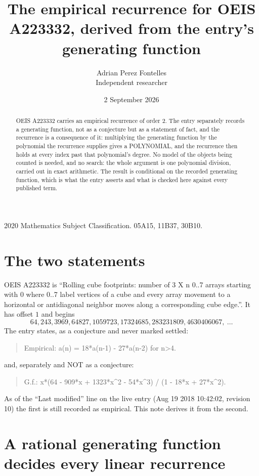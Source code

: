 \documentclass[11pt,a4paper]{article}
\title{The empirical recurrence for OEIS A223332, derived from the entry's generating function}
\author{Adrian Perez Fontelles\\ \small Independent researcher}
\date{2 September 2026}
\theoremstyle{plain}
\theoremstyle{definition}
\begin{document}
\maketitle

\begin{abstract}
OEIS A223332 carries an empirical recurrence of order $2$. The entry separately records a
generating function, not as a conjecture but as a statement of fact, and the recurrence is a
consequence of it: multiplying the generating function by the polynomial the recurrence
supplies gives a POLYNOMIAL, and the recurrence then holds at every index past that
polynomial's degree. No model of the objects being counted is needed, and no search: the
whole argument is one polynomial division, carried out in exact arithmetic. The result is
conditional on the recorded generating function, which is what the entry asserts and what is
checked here against every published term.
\end{abstract}

\noindent\small 2020 Mathematics Subject Classification. 05A15, 11B37, 30B10.\normalsize

\section{The two statements}

OEIS A223332 is ``Rolling cube footprints: number of 3 X n 0..7 arrays starting with 0 where 0..7 label vertices of a cube and every array movement to a horizontal or antidiagonal neighbor moves along a corresponding cube edge.''. It has offset $1$ and begins
\[
64, 243, 3969, 64827, 1059723, 17324685, 283231809, 4630406067,\ \dots
\]
The entry states, as a conjecture and never marked settled:
\begin{quote}
Empirical: a(n) = 18*a(n-1) - 27*a(n-2) for n>4.
\end{quote}
and, separately and NOT as a conjecture:
\begin{quote}
G.f.: x*(64 - 909*x + 1323*x\^{}2 - 54*x\^{}3) / (1 - 18*x + 27*x\^{}2).
\end{quote}
As of the ``Last modified'' line on the live entry (Aug 19 2018 10:42:02, revision 10) the first is still
recorded as empirical. This note derives it from the second.

\section{A rational generating function decides every linear recurrence}
\end{document}
